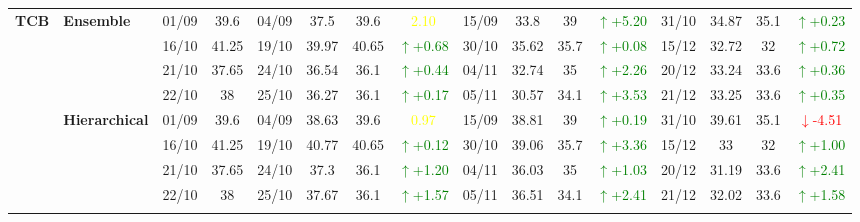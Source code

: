 \documentclass{ieeeaccess}
\begin{document}
{\begin{longtable}{llcc|cccc|cccc|cccc}
\multirow{12}{*}{\textbf{TCB}} 
& \textbf{Ensemble}
& 01/09 & 39.6 & 04/09 & 37.5 & 39.6 & \textcolor{yellow}{2.10} & 15/09 & 33.8 & 39 & \textcolor{green}{\(\uparrow\)+5.20} & 31/10 & 34.87 & 35.1 & \textcolor{green}{\(\uparrow\)+0.23} \\

&
& 16/10 & 41.25 & 19/10 & 39.97 & 40.65 & \textcolor{green}{\(\uparrow\)+0.68} & 30/10 & 35.62 & 35.7 & \textcolor{green}{\(\uparrow\)+0.08} & 15/12 & 32.72 & 32 & \textcolor{green}{\(\uparrow\)+0.72} \\

&
& 21/10 & 37.65 & 24/10 & 36.54 & 36.1 & \textcolor{green}{\(\uparrow\)+0.44} & 04/11 & 32.74 & 35 & \textcolor{green}{\(\uparrow\)+2.26} & 20/12 & 33.24 & 33.6 & \textcolor{green}{\(\uparrow\)+0.36} \\

&
& 22/10 & 38 & 25/10 & 36.27 & 36.1 & \textcolor{green}{\(\uparrow\)+0.17} & 05/11 & 30.57 & 34.1 & \textcolor{green}{\(\uparrow\)+3.53} & 21/12 & 33.25 & 33.6 & \textcolor{green}{\(\uparrow\)+0.35} \\
\cmidrule(lr){2-16}


& \textbf{Hierarchical}
& 01/09 & 39.6 & 04/09 & 38.63 & 39.6 & \textcolor{yellow}{0.97} & 15/09 & 38.81 & 39 & \textcolor{green}{\(\uparrow\)+0.19} & 31/10 & 39.61 & 35.1 & \textcolor{red}{\(\downarrow\)-4.51} \\

&
& 16/10 & 41.25 & 19/10 & 40.77 & 40.65 & \textcolor{green}{\(\uparrow\)+0.12} & 30/10 & 39.06 & 35.7 & \textcolor{green}{\(\uparrow\)+3.36} & 15/12 & 33 & 32 & \textcolor{green}{\(\uparrow\)+1.00} \\

&
& 21/10 & 37.65 & 24/10 & 37.3 & 36.1 & \textcolor{green}{\(\uparrow\)+1.20} & 04/11 & 36.03 & 35 & \textcolor{green}{\(\uparrow\)+1.03} & 20/12 & 31.19 & 33.6 & \textcolor{green}{\(\uparrow\)+2.41} \\

&
& 22/10 & 38 & 25/10 & 37.67 & 36.1 & \textcolor{green}{\(\uparrow\)+1.57} & 05/11 & 36.51 & 34.1 & \textcolor{green}{\(\uparrow\)+2.41} & 21/12 & 32.02 & 33.6 & \textcolor{green}{\(\uparrow\)+1.58} \\
\cmidrule(lr){2-16}




\end{longtable}}
\end{document}
